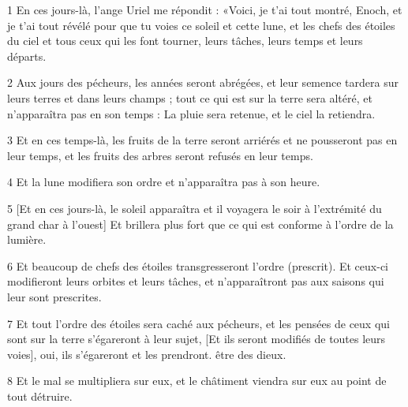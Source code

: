 \par 1 En ces jours-là, l'ange Uriel me répondit : «Voici, je t'ai tout montré, Enoch, et je t'ai tout révélé pour que tu voies ce soleil et cette lune, et les chefs des étoiles du ciel et tous ceux qui les font tourner, leurs tâches, leurs temps et leurs départs.
\par 2 Aux jours des pécheurs, les années seront abrégées, et leur semence tardera sur leurs terres et dans leurs champs ; tout ce qui est sur la terre sera altéré, et n'apparaîtra pas en son temps : La pluie sera retenue, et le ciel la retiendra.
\par 3 Et en ces temps-là, les fruits de la terre seront arriérés et ne pousseront pas en leur temps, et les fruits des arbres seront refusés en leur temps.
\par 4 Et la lune modifiera son ordre et n'apparaîtra pas à son heure.
\par 5 [Et en ces jours-là, le soleil apparaîtra et il voyagera le soir à l'extrémité du grand char à l'ouest] Et brillera plus fort que ce qui est conforme à l'ordre de la lumière.
\par 6 Et beaucoup de chefs des étoiles transgresseront l'ordre (prescrit). Et ceux-ci modifieront leurs orbites et leurs tâches, et n'apparaîtront pas aux saisons qui leur sont prescrites.
\par 7 Et tout l'ordre des étoiles sera caché aux pécheurs, et les pensées de ceux qui sont sur la terre s'égareront à leur sujet, [Et ils seront modifiés de toutes leurs voies], oui, ils s'égareront et les prendront. être des dieux.
\par 8 Et le mal se multipliera sur eux, et le châtiment viendra sur eux au point de tout détruire.


